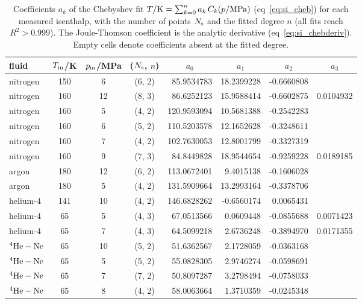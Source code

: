 \begin{table}[h]
  \centering
  \footnotesize
  \setlength{\tabcolsep}{4pt}
  \caption{\label{tab:si_cheb}Coefficients $a_k$ of the Chebyshev fit $T/{\rm K} = \sum_{k=0}^{n} a_k\, C_k(p/{\rm MPa})$ (eq~\ref{eq:si_cheb}) for each measured isenthalp, with the number of points $N_{\rm s}$ and the fitted degree $n$ (all fits reach $R^2 > 0.999$). The Joule-Thomson coefficient is the analytic derivative (eq~\ref{eq:si_chebderiv}). Empty cells denote coefficients absent at the fitted degree.}
  \begin{tabular}{lcccD{.}{.}{3.7}D{.}{.}{2.7}D{.}{.}{1.7}D{.}{.}{1.7}}
    \toprule
    fluid & $T_{\rm in}$/K & $p_{\rm in}$/MPa & ($N_{\rm s}$, $n$) &  &  &  &  \\
    \midrule
    nitrogen & 150 & 6 & (6, 2) & 85.9534783 & 18.2399228 & -0.6660808 &  \\
    nitrogen & 160 & 12 & (8, 3) & 86.6252123 & 15.9588414 & -0.6602875 & 0.0104932 \\
    nitrogen & 160 & 5 & (4, 2) & 120.9593094 & 10.5681388 & -0.2542283 &  \\
    nitrogen & 160 & 6 & (5, 2) & 110.5203578 & 12.1652628 & -0.3248611 &  \\
    nitrogen & 160 & 7 & (4, 2) & 102.7630053 & 12.8001799 & -0.3327319 &  \\
    nitrogen & 160 & 9 & (7, 3) & 84.8449828 & 18.9544654 & -0.9259228 & 0.0189185 \\
    argon & 180 & 12 & (6, 2) & 113.0672401 & 9.4015138 & -0.1606028 &  \\
    argon & 180 & 5 & (4, 2) & 131.5909664 & 13.2993164 & -0.3378706 &  \\
    helium-4 & 141 & 10 & (4, 2) & 146.6828262 & -0.6560174 & 0.0065431 &  \\
    helium-4 & 65 & 5 & (4, 3) & 67.0513566 & 0.0609448 & -0.0855688 & 0.0071423 \\
    helium-4 & 65 & 7 & (4, 3) & 64.5099218 & 2.6736248 & -0.3894970 & 0.0171355 \\
    ${\rm ^4He-Ne}$ & 65 & 10 & (5, 2) & 51.6362567 & 2.1728059 & -0.0363168 &  \\
    ${\rm ^4He-Ne}$ & 65 & 5 & (5, 2) & 55.0828305 & 2.9746274 & -0.0598691 &  \\
    ${\rm ^4He-Ne}$ & 65 & 7 & (7, 2) & 50.8097287 & 3.2798494 & -0.0758033 &  \\
    ${\rm ^4He-Ne}$ & 65 & 8 & (4, 2) & 58.0063664 & 1.3710359 & -0.0245348 &  \\

\end{tabular}
\end{table}
